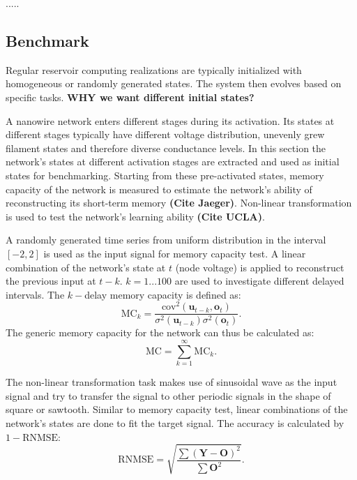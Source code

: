 \documentclass[fleqn,10pt,  reprint, amsmath,amssymb,aps, floatfix]{wlscirep}
\begin{document}
.....

\subsection*{Benchmark}

Regular reservoir computing realizations are typically initialized with homogeneous or randomly generated states. The system then evolves based on specific tasks. \textbf{WHY we want different initial states?}


A nanowire network enters different stages during its activation. Its states at different stages typically have different voltage distribution, unevenly grew filament states and therefore diverse conductance levels. 
In this section the network's states at different activation stages are extracted and used as initial states for benchmarking. Starting from these pre-activated states, memory capacity of the network is measured to estimate the network's ability of reconstructing its short-term memory \textbf{(Cite Jaeger)}. Non-linear transformation is used to test the network's learning ability \textbf{(Cite UCLA)}.

A randomly generated time series from uniform distribution in the interval $[-2,2]$ is used as the input signal for memory capacity test. A linear combination of the network's state at $t$ (node voltage) is applied to reconstruct the previous input at $t - k$. $k = 1 ... 100$ are used to investigate different delayed intervals. The $k-$delay memory capacity is defined as:
\begin{equation}
	\text{MC}_k = \dfrac{\text{cov}^2(\mathbf u_{t-k}, \mathbf o_t)}{\sigma^2 (\mathbf u_{t-k}) \sigma^2 (\mathbf o_t)}.
\end{equation}
The generic memory capacity for the network can thus be calculated as:
\begin{equation}
	\text{MC} = \sum \limits_{k=1}^\infty \text{MC}_k.
\end{equation}

The non-linear transformation task makes use of sinusoidal wave as the input signal and try to transfer the signal to other periodic signals in the shape of square or sawtooth. Similar to memory capacity test, linear combinations of the network's states are done to fit the target signal. The accuracy is calculated by $1 - \text{RNMSE}$:
\begin{equation}
	\text{RNMSE} = \sqrt{\dfrac{\sum (\mathbf Y - \mathbf O)^2}{\sum \mathbf O^2}}.
\end{equation}
\end{document}

